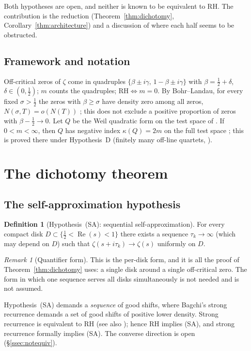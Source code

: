 \documentclass[11pt]{amsart}
\theoremstyle{definition}
\newtheorem{definition}[theorem]{Definition}
\theoremstyle{remark}
\newtheorem{remark}[theorem]{Remark}
\newcommand{\RH}{\mathrm{RH}}
\DeclareMathOperator{\Real}{Re}
\begin{document}
Both hypotheses are open, and neither is known to be equivalent to RH. The
contribution is the reduction (Theorem~\ref{thm:dichotomy},
Corollary~\ref{thm:architecture}) and a discussion of where each half
seems to be obstructed.

\subsection{Framework and notation}
Off-critical zeros of $\zeta$ come in quadruples
$\{\beta\pm i\gamma,\,1-\beta\pm i\gamma\}$ with $\beta=\tfrac12+\delta$,
$\delta\in(0,\tfrac12)$; $m$ counts the quadruples; $\RH\iff m=0$. By
Bohr--Landau, for every fixed $\sigma>\tfrac12$ the zeros with $\beta\ge\sigma$
have density zero among all zeros, $N(\sigma,T)=o(N(T))$
\cite[\S9.15]{Titchmarsh}; this does not exclude a positive proportion of
zeros with $\beta-\tfrac12\to0$. Let $Q$ be the Weil quadratic form on the
test space of \cite[Def.~2.1]{P25}. If
$0<m<\infty$, then $Q$ has negative index $\kappa(Q)=2m$ on the full test
space \cite[Prop.~4.7]{P25}; this is proved there under Hypothesis~D
(finitely many off-line quartets, \cite[Def.~2.4]{P25}).

\section{The dichotomy theorem}\label{sec:dichotomy}

\subsection{The self-approximation hypothesis}
\begin{definition}[Hypothesis~(SA): sequential self-approximation]\label{def:lp112}
For every compact disk $D\subset\{\tfrac12<\Real(s)<1\}$ there exists a
sequence $\tau_k\to\infty$ (which may depend on $D$) such that
$\zeta(s+i\tau_k)\to\zeta(s)$ uniformly on $D$.
\end{definition}

\begin{remark}[Quantifier form]
This is the per-disk form, and it is all the proof of
Theorem~\ref{thm:dichotomy} uses: a single disk around a single
off-critical zero. The form in which one sequence serves all disks
simultaneously is not needed and is not assumed.
\end{remark}

Hypothesis~(SA) demands a \emph{sequence} of good shifts, where Bagchi's
strong recurrence demands a set of good shifts of positive lower density.
Strong recurrence is equivalent to RH \cite{Bagchi87}
(see also \cite[\S5.5]{P27}); hence RH implies (SA), and strong recurrence
formally implies (SA). The converse direction is open
(\S\ref{ssec:notequiv}).
\end{document}
